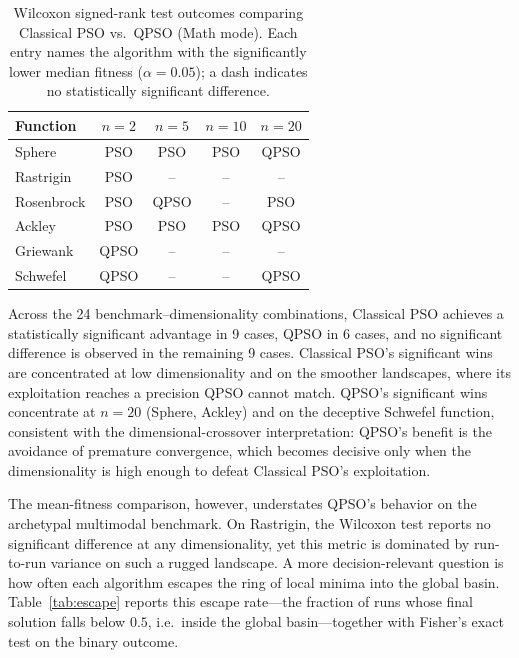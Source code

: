 \begin{table}[htbp]
\centering
\caption{Wilcoxon signed-rank test outcomes comparing Classical PSO vs.\ QPSO (Math mode). Each entry names the algorithm with the significantly lower median fitness ($\alpha = 0.05$); a dash indicates no statistically significant difference.}
\label{tab:wilcoxon}
\small
\begin{tabular}{@{}lcccc@{}}
\toprule
\textbf{Function} & $n=2$ & $n=5$ & $n=10$ & $n=20$ \\
\midrule
Sphere     & PSO  & PSO  & PSO  & QPSO \\
Rastrigin  & PSO  & --   & --   & --   \\
Rosenbrock & PSO  & QPSO & --   & PSO  \\
Ackley     & PSO  & PSO  & PSO  & QPSO \\
Griewank   & QPSO & --   & --   & --   \\
Schwefel   & QPSO & --   & --   & QPSO \\
\bottomrule
\end{tabular}
\end{table}

Across the 24 benchmark--dimensionality combinations, Classical PSO achieves a statistically significant advantage in 9 cases, QPSO in 6 cases, and no significant difference is observed in the remaining 9 cases. Classical PSO's significant wins are concentrated at low dimensionality and on the smoother landscapes, where its exploitation reaches a precision QPSO cannot match. QPSO's significant wins concentrate at $n = 20$ (Sphere, Ackley) and on the deceptive Schwefel function, consistent with the dimensional-crossover interpretation: QPSO's benefit is the avoidance of premature convergence, which becomes decisive only when the dimensionality is high enough to defeat Classical PSO's exploitation.

The mean-fitness comparison, however, understates QPSO's behavior on the archetypal multimodal benchmark. On Rastrigin, the Wilcoxon test reports no significant difference at any dimensionality, yet this metric is dominated by run-to-run variance on such a rugged landscape. A more decision-relevant question is how often each algorithm escapes the ring of local minima into the global basin. Table~\ref{tab:escape} reports this escape rate---the fraction of runs whose final solution falls below $0.5$, i.e.\ inside the global basin---together with Fisher's exact test on the binary outcome.

